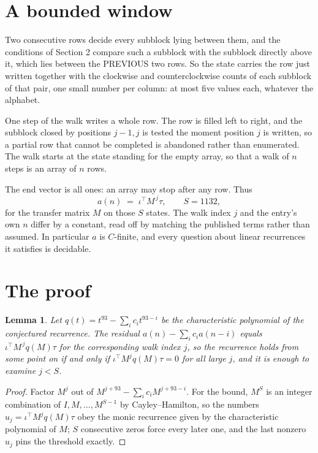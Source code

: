 \documentclass[11pt,a4paper]{article}
\theoremstyle{plain}
\newtheorem{lemma}[theorem]{Lemma}
\theoremstyle{definition}
\begin{document}
\section{A bounded window}

Two consecutive rows decide every subblock lying between them, and the conditions of Section 2 compare such a subblock with the subblock directly above it, which lies between the PREVIOUS two rows. So the state carries the row just written together with the clockwise and counterclockwise counts of each subblock of that pair, one small number per column: at most five values each, whatever the alphabet.

One step of the walk writes a whole row. The row is filled left to right, and the subblock
closed by positions $j-1,j$ is tested the moment position $j$ is written, so a partial row that
cannot be completed is abandoned rather than enumerated. The walk starts at the state standing
for the empty array, so that a walk of $n$ steps is an array of $n$ rows.

The end vector is all ones: an array may stop after any row. Thus
\[
a(n)\;=\;\iota^{\!\top}M^{\,j}\tau ,\qquad S=1132,
\]
for the transfer matrix $M$ on those $S$ states. The walk index $j$ and the entry's own $n$
differ by a constant, read off by matching the published terms rather than assumed. In
particular $a$ is $C$-finite, and every question about linear recurrences it satisfies is
decidable.

\section{The proof}

\begin{lemma}\label{lem:crit}
Let $q(t)=t^{93}-\sum_i c_it^{93-i}$ be the characteristic polynomial of the
conjectured recurrence. The residual $a(n)-\sum_ic_ia(n-i)$ equals
$\iota^{\!\top}M^{\,j}q(M)\tau$ for the corresponding walk index $j$, so the recurrence
holds from some point on if and only if $\iota^{\!\top}M^{j}q(M)\tau=0$ for all large $j$,
and it is enough to examine $j<S$.
\end{lemma}

\begin{proof}
Factor $M^{j}$ out of $M^{j+93}-\sum_ic_iM^{j+93-i}$. For the bound, $M^{S}$
is an integer combination of $I,M,\dots,M^{S-1}$ by Cayley--Hamilton, so the numbers
$u_j=\iota^{\!\top}M^{j}q(M)\tau$ obey the monic recurrence given by the characteristic
polynomial of $M$; $S$ consecutive zeros force every later one, and the last nonzero $u_j$
pins the threshold exactly.
\end{proof}
\end{document}
